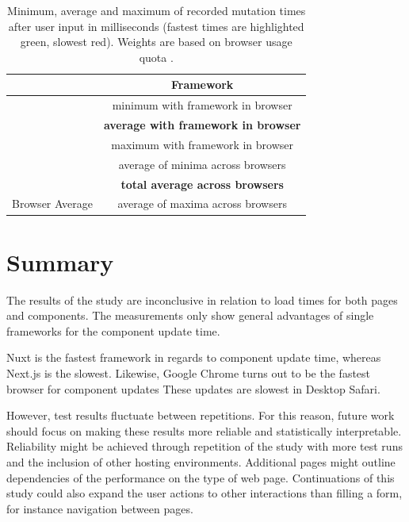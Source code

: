 \documentclass[a4paper, 12pt]{article}
\begin{document}
\begin{table}[h!]
{    \vspace{0.5cm}
      
    {
    
      \begin{tabular}{|l|c|}
        \hline
        ~                                           & \textbf{Framework} \\ \hline
        \rowcolor{white}                            & minimum with framework in browser \\
        \rowcolor{white}                            & \textbf{average with framework in browser} \\
        \rowcolor{white} \multirow{-3}{*}{Browser}  & maximum with framework in browser \\ \hline \hline
                                                    & average of minima across browsers \\
                                                    & \textbf{total average across browsers} \\
                \multirow{-3}{*}{Browser Average}   & average of maxima across browsers \\ \hline
      \end{tabular}
    }
  \caption{Minimum, average and maximum of recorded mutation times after user input in milliseconds (fastest times are highlighted green, slowest red). Weights are based on browser usage quota \citep{browserUsage}.}
  \label{tab:mutations:times}
  }
\end{table}

\section{Summary}

The results of the study are inconclusive in relation to load times for both pages and components.
The measurements only show general advantages of single frameworks for the component update time.

Nuxt is the fastest framework in regards to component update time, whereas Next.js is the slowest.
Likewise, Google Chrome turns out to be the fastest browser for component updates
These updates are slowest in Desktop Safari.

However, test results fluctuate between repetitions. For this reason, future work should focus on making these results more reliable and statistically interpretable.
Reliability might be achieved through repetition of the study with more test runs and the inclusion of other hosting environments.
Additional pages might outline dependencies of the performance on the type of web page.
Continuations of this study could also expand the user actions to other interactions than filling a form, for instance navigation between pages.
\end{document}
